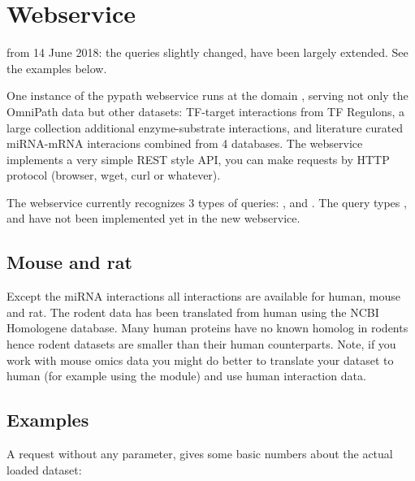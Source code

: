 \documentclass[letterpaper,10pt,english]{sphinxmanual}
\begin{document}
\chapter{Webservice}
\label{\detokenize{webservice:webservice}}\label{\detokenize{webservice::doc}}
 from 14 June 2018: the queries slightly changed, have been
largely extended. See the examples below.

One instance of the pypath webservice runs at the domain
, serving not only the OmniPath data but other datasets:
TF-target interactions from TF Regulons, a large collection additional
enzyme-substrate interactions, and literature curated miRNA-mRNA interacions
combined from 4 databases. The webservice implements a very simple REST style
API, you can make requests by HTTP protocol (browser, wget, curl or whatever).

The webservice currently recognizes 3 types of queries: ,
 and . The query types ,  and
 have not been implemented yet in the new webservice.


\section{Mouse and rat}
\label{\detokenize{webservice:mouse-and-rat}}
Except the miRNA interactions all interactions are available for human, mouse
and rat. The rodent data has been translated from human using the NCBI
Homologene database. Many human proteins have no known homolog in rodents
hence rodent datasets are smaller than their human counterparts. Note, if you
work with mouse omics data you might do better to translate your dataset to
human (for example using the  module) and use human
interaction data.


\section{Examples}
\label{\detokenize{webservice:examples}}
A request without any parameter, gives some basic numbers about the actual
loaded dataset:
\begin{quote}

\end{quote}
\end{document}
